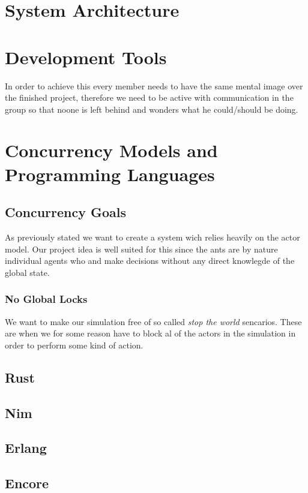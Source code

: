 \documentclass[a4paper]{article}
\begin{document}
\section{System Architecture}

\section{Development Tools}
In order to achieve this every member needs to have the same mental image over the finished project, therefore we need to be active with communication in the group so that noone is left behind and wonders what he could/should be doing. 

\section{Concurrency Models and Programming Languages}
\subsection{Concurrency Goals}
As previously stated we want to create a system wich relies heavily on the actor model. Our project idea
is well suited for this since the ants are by nature individual agents who and make decisions without any direct knowlegde
of the global state.
\subsubsection{No Global Locks}
We want to make our simulation free of so called \emph{stop the world}
sencarios. These are when we for some reason have to block al of the actors in
the simulation in order to perform some kind of action.


\subsection{Rust}

\subsection{Nim}

\subsection{Erlang}

\subsection{Encore}
\end{document}
